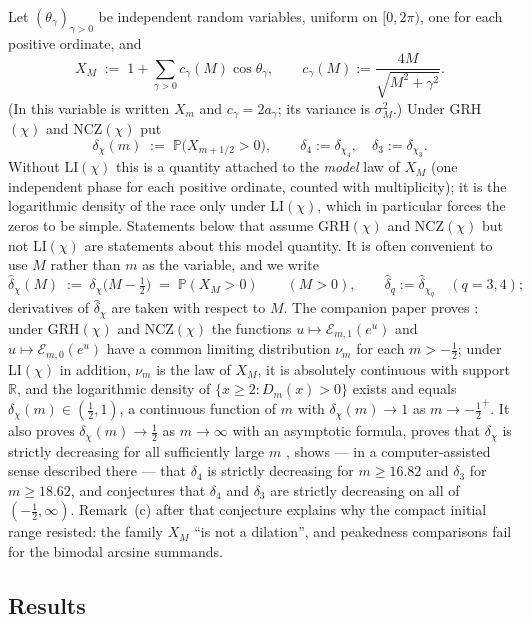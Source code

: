 \documentclass[11pt]{amsart}
\theoremstyle{definition}
\numberwithin{equation}{section}
\newcommand{\PP}{\mathbb P}
\newcommand{\cE}{\mathcal E}
\newcommand{\hd}{\widehat\delta}
\begin{document}
Let $(\theta_\gamma)_{\gamma>0}$ be independent random variables,
uniform on $[0,2\pi)$, one for each positive ordinate, and
\begin{equation}\label{eq:XM}
X_M\;:=\;1+\sum_{\gamma>0}c_\gamma(M)\cos\theta_\gamma,
\qquad
c_\gamma(M):=\frac{4M}{\sqrt{M^2+\gamma^2}} .
\end{equation}
(In \cite{WR} this variable is written $X_m$ and $c_\gamma=2a_\gamma$;
its variance is $\sigma_M^2$.) Under GRH$(\chi)$ and NCZ$(\chi)$ put
\[
\delta_\chi(m)\;:=\;\PP\bigl(X_{m+1/2}>0\bigr),\qquad
\delta_4:=\delta_{\chi_4},\quad\delta_3:=\delta_{\chi_3}.
\]
Without LI$(\chi)$ this is a quantity attached to the \emph{model} law
of $X_M$ (one independent phase for each positive ordinate, counted
with multiplicity); it is the logarithmic density of the race only
under LI$(\chi)$, which in particular forces the zeros to be simple.
Statements below that assume GRH$(\chi)$ and NCZ$(\chi)$ but not
LI$(\chi)$ are statements about this model quantity. It is often
convenient to use $M$ rather than $m$ as the variable, and we write
\[
\hd_\chi(M)\;:=\;\delta_\chi\bigl(M-\tfrac12\bigr)\;=\;\PP(X_M>0)
\qquad(M>0),\qquad \hd_q:=\hd_{\chi_q}\quad(q=3,4);
\]
derivatives of $\hd_\chi$ are taken with respect to $M$.
The companion paper proves \cite[Theorem~1, Proposition~1]{WR}: under
GRH$(\chi)$ and NCZ$(\chi)$ the functions $u\mapsto\cE_{m,1}(e^u)$ and
$u\mapsto\cE_{m,0}(e^u)$ have a common limiting distribution $\nu_m$
for each $m>-\tfrac12$; under LI$(\chi)$ in addition, $\nu_m$ is the
law of $X_M$, it is absolutely continuous with support $\mathbb R$,
and the logarithmic density of $\{x\ge2:D_m(x)>0\}$ exists and equals
$\delta_\chi(m)\in(\tfrac12,1)$, a continuous function of $m$ with
$\delta_\chi(m)\to1$ as $m\to-\tfrac12^+$. It also proves
$\delta_\chi(m)\to\tfrac12$ as $m\to\infty$ with an asymptotic formula,
proves that $\delta_\chi$ is strictly decreasing for all sufficiently
large $m$ \cite[Theorem~4]{WR}, shows --- in a computer-assisted
sense described there \cite[Corollary~7 and Remark~13]{WR} --- that
$\delta_4$ is strictly decreasing for $m\ge16.82$ and $\delta_3$ for
$m\ge18.62$, and conjectures \cite[Conjecture~1]{WR} that $\delta_4$ and $\delta_3$ are
strictly decreasing on all of $(-\tfrac12,\infty)$. Remark~(c) after
that conjecture explains why the compact initial range resisted: the
family $X_M$ ``is not a dilation'', and peakedness comparisons fail
for the bimodal arcsine summands.

\subsection{Results}
\end{document}
